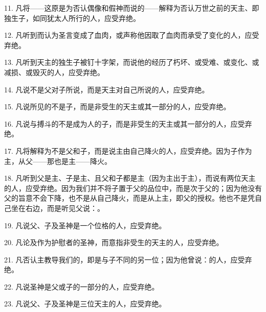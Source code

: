11. 凡将——这原是为否认偶像和假神而说的——解释为否认万世之前的天主、即独生子，如同犹太人所行的人，应受弃绝。\par

12. 凡听到而认为圣言变成了血肉，或声称他因取了血肉而承受了变化的人，应受弃绝。\par

13. 凡听到天主的独生子被钉十字架，而说他的经历了朽坏、或受难、或变化、或减损、或毁灭的人，应受弃绝。\par

14. 凡说不是父对子所说，而是天主对自己所说的人，应受弃绝。\par

15. 凡说所见的不是子，而是非受生的天主或其一部分的人，应受弃绝。\par

16. 凡说与搏斗的不是成为人的子，而是非受生的天主或其一部分的人，应受弃绝。\par

17. 凡将解释为不是父和子，而是说主由自己降火的人，应受弃绝。因为子作为主，从父——那也是主——降火。\par

18. 凡听到父是主、子是主、且父和子都是主（因为主出于主），而说有两位天主的人，应受弃绝。因为我们并不将子置于父的品位中，而是次于父的；因为他没有父的旨意不会下降，也不是从自己降火，而是从上主，即父的授权。他也不是凭自己坐在右边，而是听见父说：。\par

19. 凡说父、子及圣神是一个位格的人，应受弃绝。\par

20. 凡论及作为护慰者的圣神，而意指非受生的天主的人，应受弃绝。\par

21. 凡否认主教导我们的，即是与子不同的另一位；因为他曾说：的人，应受弃绝。\par

22. 凡说圣神是父或子的一部分的人，应受弃绝。\par

23. 凡说父、子及圣神是三位天主的人，应受弃绝。\par

